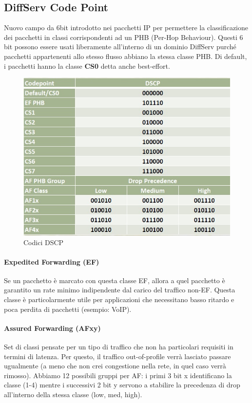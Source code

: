 \documentclass{article}
\begin{document}
\subsection{DiffServ Code Point}
Nuovo campo da 6bit introdotto nei pacchetti IP per permettere la classificazione dei pacchetti in classi corrispondenti ad un PHB (Per-Hop Behaviour). Questi 6 bit possono essere usati liberamente all'interno di un dominio DiffServ purché pacchetti appartenenti allo stesso flusso abbiano la stessa classe PHB. Di default, i pacchetti hanno la classe \textbf{CS0} detta anche best-effort.\\

\begin{figure}[H]
    \centering
    \includegraphics[scale=0.5]{figures/dscp.jpg}
    \caption{Codici DSCP}
\end{figure}

\paragraph{Expedited Forwarding (EF)} Se un pacchetto è marcato con questa classe EF, allora a quel pacchetto è garantito un rate minimo indipendente dal carico del traffico non-EF. Questa classe è particolarmente utile per applicazioni che necessitano basso ritardo e poca perdita di pacchetti (esempio: VoIP).
\paragraph{Assured Forwarding (AFxy)} Set di classi pensate per un tipo di traffico che non ha particolari requisiti in termini di latenza. Per questo, il traffico out-of-profile verrà lasciato passare ugualmente (a meno che non crei congestione nella rete, in quel caso verrà rimosso). Abbiamo 12 possibili gruppi per AF: i primi 3 bit x identificano la classe (1-4) mentre i successivi 2 bit y servono a stabilire la precedenza di drop all'interno della stessa classe (low, med, high).\\
\end{document}
